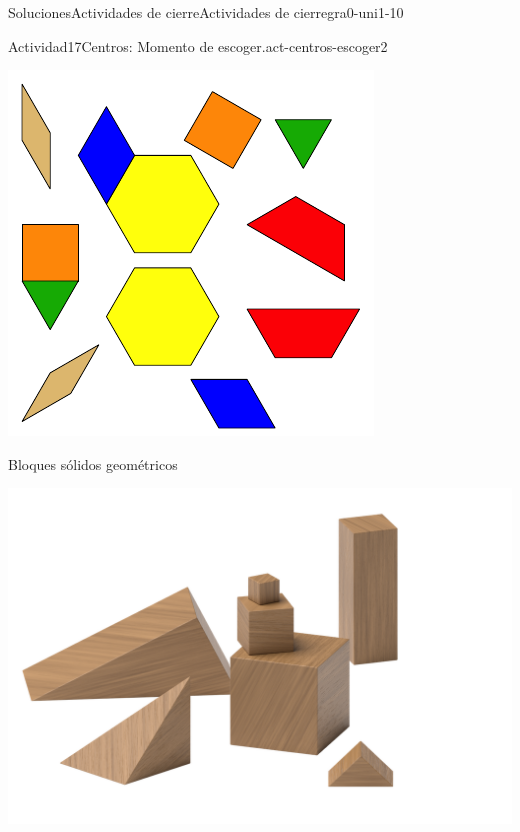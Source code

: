 \documentclass[twoside,10pt,]{article}
\begin{document}
\begin{solutions-section}{Soluciones}{Actividades de cierre}{}{Actividades de cierre}{}{}{gra0-uni1-10}
\begin{activitysolution}{Actividad}{17}{Centros: Momento de escoger.}{act-centros-escoger2}
\begin{sidebyside}{2}{0.025}{0.025}{0.05}
\begin{sbspanel}{0.45}
\includegraphics[width=\linewidth]{external/svg-source/tikz-file-147344.pdf}
\end{sbspanel}%
\end{sidebyside}%
\begin{sidebyside}{2}{0.025}{0.025}{0.05}%
\begin{sbspanel}{0.45}%
Bloques sólidos geométricos%
\par
\includegraphics[width=\linewidth]{external/png-source/K.1.A Beta Student Workbook.Geoblocks.png}
\end{sbspanel}%

\end{sidebyside}
\end{activitysolution}
\end{solutions-section}
\end{document}
